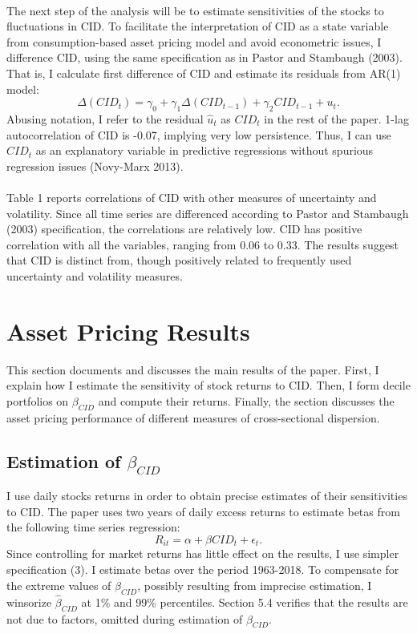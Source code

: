 \documentclass[12pt]{article}
\begin{document}
\paragraph{}
The next step of the analysis will be to estimate sensitivities of the stocks to fluctuations in CID. To facilitate the interpretation of CID as a state variable from consumption-based asset pricing model and avoid econometric issues, I difference CID, using the same specification as in Pastor and Stambaugh (2003). That is, I calculate first difference of CID and estimate its residuals from AR(1) model:
\begin{equation}
\Delta(CID_t) = \gamma_0 + \gamma_1 \Delta(CID_{t-1}) + \gamma_2 CID_{t-1} + u_t.
\end{equation}
Abusing notation, I refer to the residual $\hat{u}_t$ as $CID_t$ in the rest of the paper. 1-lag autocorrelation of CID is -0.07, implying very low persistence. Thus, I can use $CID_t$ as an explanatory variable in predictive regressions without spurious regression issues (Novy-Marx 2013). 
\paragraph{}
Table 1 reports correlations of CID with other measures of uncertainty and volatility. Since all time series are differenced according to Pastor and Stambaugh (2003) specification, the correlations are relatively low. CID has positive correlation with all the variables, ranging from 0.06 to 0.33. The results suggest that CID is distinct from, though positively related to frequently used uncertainty and volatility measures.

\section{Asset Pricing Results} \label{sec:Model}

This section documents and discusses the main results of the paper. First, I explain how I estimate the sensitivity of stock returns to CID. Then, I form decile portfolios on $\beta_{CID}$ and compute their returns. Finally, the section discusses the asset pricing performance of different measures of cross-sectional dispersion.

\subsection{Estimation of $\beta_{CID}$}
I use daily stocks returns in order to obtain precise estimates of their sensitivities to CID. The paper uses two years of daily excess returns to estimate betas from the following time series regression:
\begin{equation}
R_{it}=\alpha+\beta CID_t + \epsilon_t.
\end{equation}
Since controlling for market returns has little effect on the results, I use simpler specification (3). I estimate betas over the period 1963-2018. To compensate for the extreme values of $\hat{\beta}_{CID}$, possibly resulting from imprecise estimation, I winsorize $\hat{\beta}_{CID}$ at 1\% and 99\% percentiles. Section 5.4 verifies that the results are not due to factors, omitted during estimation of $\beta_{CID}$.  
\end{document}
